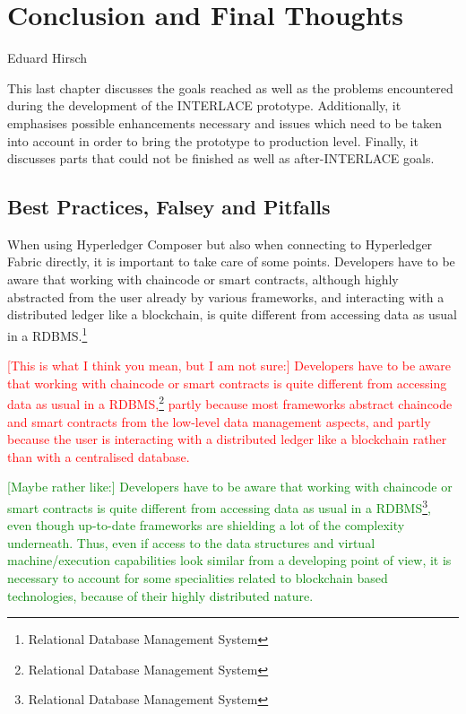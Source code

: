 \chapter{Conclusion and Final Thoughts}
\label{ch:conclusion}

\vspace{-1cm}
\begin{center}
Eduard Hirsch
\end{center}

This last chapter discusses the goals reached as well as the problems encountered during the development of the INTERLACE prototype. Additionally, it emphasises possible enhancements necessary and issues which need to be taken into account in order to bring the prototype to production level. Finally, it discusses parts that could not be finished as well as after-INTERLACE goals.

\section{Best Practices, Falsey and Pitfalls}

When using Hyperledger Composer but also when connecting to Hyperledger Fabric directly, it is important to take care of some points. Developers have to be aware that working with chaincode or smart contracts, although highly abstracted from the user already by various frameworks, and interacting with a distributed ledger like a blockchain, is quite different from accessing data as usual in a RDBMS.\footnote{Relational Database Management System}

\textcolor{red}{[This is what I think you mean, but I am not sure:] Developers have to be aware that working with chaincode or smart contracts is quite different from accessing data as usual in a RDBMS,\footnote{Relational Database Management System} partly because most frameworks abstract chaincode and smart contracts from the low-level data management aspects, and partly because the user is interacting with a distributed ledger like a blockchain rather than with a centralised database.}

\textcolor{green}{[Maybe rather like:] Developers have to be aware that working with chaincode or smart contracts is quite different from accessing data as usual in a RDBMS\footnote{Relational Database Management System}, even though up-to-date frameworks are shielding a lot of the complexity underneath. Thus, even if access to the data structures and virtual machine/execution capabilities look similar from a developing point of view, it is necessary to account for some specialities related to blockchain based technologies, because of their highly distributed nature.}

